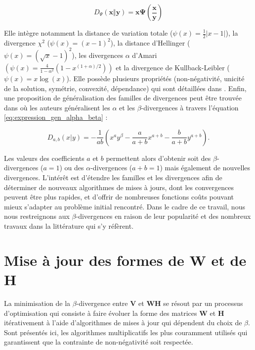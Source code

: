 \begin{equation}
D_{\Psi} (\mathbf{x} \Vert\mathbf{y}) = \mathbf{x} \mathbf{\Psi} \left( \frac{\mathbf{x}}{\mathbf{y}}\right)
\end{equation}

Elle intègre notamment la distance de variation totale ($\psi(x) = \frac{1}{2}\vert x-1 \vert $), la divergence $\chi^2$ ($\psi(x) = (x-1)^2$), la distance d'Hellinger ($\psi(x) = (\sqrt{x}-1)^2$), les divergences $\alpha$ d'Amari $(\psi(x) = \frac{4}{1-\alpha^2} \left(1-x^{(1+\alpha)/2} \right))$ et la divergence de Kullback-Leibler ($\psi(x) = x\log (x)$). Elle possède plusieurs propriétés (non-négativité, unicité de la solution, symétrie, convexité, dépendance) qui sont détaillées dans \cite{csiszar2004information}.
Enfin, une proposition de généralisation des familles de divergences peut être trouvée dans \cite{cichocki_generalized_2011} où les auteurs généralisent les $\alpha$ et les $\beta$-divergences à travers l'équation  \ref{eq:expression_gen_alpha_beta} :

\begin{equation}\label{eq:expression_gen_alpha_beta}
D_{a, b}(x \vert y) = -\frac{1}{a b}\left(x^{a}y^{\beta}- \frac{a}{a+b}x^{a + b}-\frac{b}{a+b}y^{a+b} \right).
\end{equation}

Les valeurs des coefficients $a$ et $b$ permettent alors d'obtenir soit des $\beta$-divergences ($a = 1$) ou des $\alpha$-divergences ($a+b = 1$) mais également de nouvelles divergences. L'intérêt est d'étendre les familles et les divergences afin de déterminer de nouveaux algorithmes de mises à jours, dont les convergences peuvent être plus rapides, et d'offrir de nombreuses fonctions coûts pouvant mieux s'adapter au problème initial rencontré. Dans le cadre de ce travail, nous nous restreignons aux $\beta$-divergences en raison de leur popularité et des nombreux travaux dans la littérature qui s'y réfèrent.

\section{Mise à jour des formes de \textbf{W} et de \textbf{H}}

La minimisation de la $\beta$-divergence entre $\mathbf{V}$ et $\mathbf{WH}$ se résout par un processus d'optimisation qui consiste à faire évoluer la forme des matrices $\mathbf{W}$ et $\mathbf{H}$ itérativement à l'aide d'algorithmes de mises à jour qui dépendent du choix de $\beta$.
Sont présentés ici, les algorithmes multiplicatifs les plus couramment utilisés qui garantissent que la contrainte de non-négativité soit respectée.


